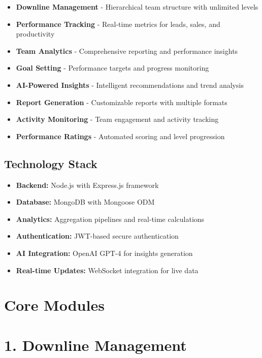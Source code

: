 \documentclass[12pt,a4paper]{article}
\begin{document}
\begin{itemize}
    \item \textbf{Downline Management} - Hierarchical team structure with unlimited levels
    \item \textbf{Performance Tracking} - Real-time metrics for leads, sales, and productivity
    \item \textbf{Team Analytics} - Comprehensive reporting and performance insights
    \item \textbf{Goal Setting} - Performance targets and progress monitoring
    \item \textbf{AI-Powered Insights} - Intelligent recommendations and trend analysis
    \item \textbf{Report Generation} - Customizable reports with multiple formats
    \item \textbf{Activity Monitoring} - Team engagement and activity tracking
    \item \textbf{Performance Ratings} - Automated scoring and level progression
\end{itemize}

\subsection{Technology Stack}

\begin{itemize}
    \item \textbf{Backend:} Node.js with Express.js framework
    \item \textbf{Database:} MongoDB with Mongoose ODM
    \item \textbf{Analytics:} Aggregation pipelines and real-time calculations
    \item \textbf{Authentication:} JWT-based secure authentication
    \item \textbf{AI Integration:} OpenAI GPT-4 for insights generation
    \item \textbf{Real-time Updates:} WebSocket integration for live data
\end{itemize}

\section{Core Modules}

\section{1. Downline Management}
\end{document}

